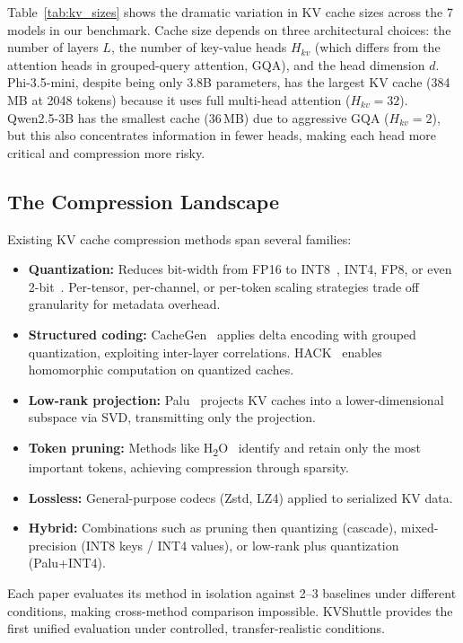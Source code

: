 \documentclass{article}
\begin{document}
Table~\ref{tab:kv_sizes} shows the dramatic variation in KV cache sizes across the 7 models in our benchmark. Cache size depends on three architectural choices: the number of layers $L$, the number of key-value heads $H_{kv}$ (which differs from the attention heads in grouped-query attention, GQA), and the head dimension $d$. Phi-3.5-mini, despite being only 3.8B parameters, has the largest KV cache (384\,MB at 2048 tokens) because it uses full multi-head attention ($H_{kv} = 32$). Qwen2.5-3B has the smallest cache (36\,MB) due to aggressive GQA ($H_{kv} = 2$), but this also concentrates information in fewer heads, making each head more critical and compression more risky.

\subsection{The Compression Landscape}

Existing KV cache compression methods span several families:

\begin{itemize}    \item \textbf{Quantization:} Reduces bit-width from FP16 to INT8~\citep{dettmers2022gptint8}, INT4, FP8, or even 2-bit~\citep{liu2024kivi, hooper2024kvquant}. Per-tensor, per-channel, or per-token scaling strategies trade off granularity for metadata overhead.
    \item \textbf{Structured coding:} CacheGen~\citep{liu2024cachegen} applies delta encoding with grouped quantization, exploiting inter-layer correlations. HACK~\citep{hack2025} enables homomorphic computation on quantized caches.
    \item \textbf{Low-rank projection:} Palu~\citep{palu2025} projects KV caches into a lower-dimensional subspace via SVD, transmitting only the projection.
    \item \textbf{Token pruning:} Methods like H\textsubscript{2}O~\citep{zhang2024h2o} identify and retain only the most important tokens, achieving compression through sparsity.
    \item \textbf{Lossless:} General-purpose codecs (Zstd, LZ4) applied to serialized KV data.
    \item \textbf{Hybrid:} Combinations such as pruning then quantizing (cascade), mixed-precision (INT8 keys / INT4 values), or low-rank plus quantization (Palu+INT4).
\end{itemize}

Each paper evaluates its method in isolation against 2--3 baselines under different conditions, making cross-method comparison impossible. KVShuttle provides the first unified evaluation under controlled, transfer-realistic conditions.
\end{document}
